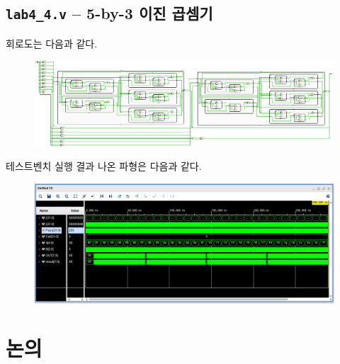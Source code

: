 \documentclass{scrartcl}
\begin{document}
\subsection{\texttt{lab4\_4.v} -- 5-by-3 이진 곱셈기}
회로도는 다음과 같다.
\begin{figure}[H]
  \centering
  \includegraphics[width=0.9\linewidth]{lab4_4_schematic-crop.pdf}
\end{figure}
테스트벤치 실행 결과 나온 파형은 다음과 같다.
\begin{figure}[H]
  \centering
  \includegraphics[width=0.9\linewidth]{lab4_4_waveform.png}
\end{figure}

\section{논의}
\end{document}
